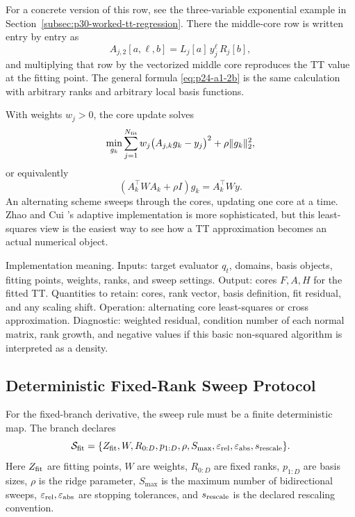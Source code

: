 \documentclass[11pt]{article}
\numberwithin{equation}{section}
\begin{document}
For a concrete version of this row, see the three-variable exponential example
in Section~\ref{subsec:p30-worked-tt-regression}.  There the middle-core row
is written entry by entry as
\[
    A_{j,2}[a,\ell,b]=L_j[a]\,y_j^\ell\,R_j[b],
\]
and multiplying that row by the vectorized middle core reproduces the TT value
at the fitting point.  The general formula \eqref{eq:p24-a1-2b} is the same
calculation with arbitrary ranks and arbitrary local basis functions.

With weights \(w_j>0\), the core update solves
\begin{equation}
    \min_{g_k}
    \sum_{j=1}^{N_{\rm fit}}w_j\bigl(A_{j,k}g_k-y_j\bigr)^2
    +\rho\|g_k\|_2^2,
    \label{eq:p24-a1-2c}
\end{equation}
or equivalently
\begin{equation}
    (A_k^\top W A_k+\rho I)g_k=A_k^\top Wy.
    \label{eq:p24-a1-2d}
\end{equation}
An alternating scheme sweeps through the cores, updating one core at a time.
Zhao and Cui \cite{zhao2024ttsequential}'s adaptive implementation is more sophisticated, but this least-
squares view is the easiest way to see how a TT approximation becomes an
actual numerical object.

Implementation meaning. Inputs: target evaluator \(q_t\), domains,
basis objects, fitting points, weights, ranks, and sweep settings.  Output:
cores \(F,A,H\) for the fitted TT.  Quantities to retain: cores, rank vector, basis
definition, fit residual, and any scaling shift.  Operation: alternating core
least-squares or cross approximation.  Diagnostic: weighted residual, condition
number of each normal matrix, rank growth, and negative values if this basic
non-squared algorithm is interpreted as a density.

\subsection*{Deterministic Fixed-Rank Sweep Protocol}

For the fixed-branch derivative, the sweep rule must be a finite deterministic
map.  The branch declares
\begin{equation}
    \mathcal S_{\rm fit}
    =
    \{Z_{\rm fit},W,R_{0:D},p_{1:D},\rho,S_{\max},
      \varepsilon_{\rm rel},\varepsilon_{\rm abs},s_{\rm rescale}\}.
    \label{eq:p24-p23-sweep1}
\end{equation}
Here \(Z_{\rm fit}\) are fitting points, \(W\) are weights, \(R_{0:D}\) are
fixed ranks, \(p_{1:D}\) are basis sizes, \(\rho\) is the ridge parameter,
\(S_{\max}\) is the maximum number of bidirectional sweeps,
\(\varepsilon_{\rm rel},\varepsilon_{\rm abs}\) are stopping tolerances, and
\(s_{\rm rescale}\) is the declared rescaling convention.
\end{document}
